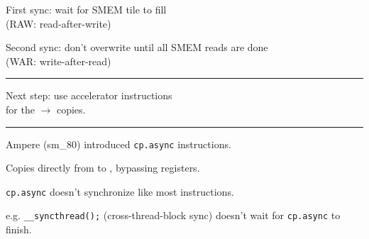 \newpage
{}

{\LARGE
First sync: wait for SMEM tile to fill\\(RAW: read-after-write)

Second sync: don't overwrite until all SMEM reads are done\\(WAR: write-after-read)

}

\vfill
\hrule
\vfill

\begin{center}
\Large
\begin{tikzpicture}[node distance=0mm]

\end{tikzpicture}
\end{center}

\newpage
{}

{\LARGE
Next step: use accelerator instructions\\for the $\to$ copies.

}

\vfill
\hrule
\vfill

\begin{center}
\Large
{}
\end{center}


\newpage
{}

{\LARGE
Ampere (sm\_80) introduced \texttt{cp.async} instructions.

Copies directly from  to , bypassing registers.

}
\vfill

\begin{center}
\Large
\begin{tikzpicture}[node distance=0mm]

\end{tikzpicture}
\end{center}


\newpage
{}

{\LARGE
\texttt{cp.async} doesn't synchronize like most instructions.

e.g. \texttt{\_\_syncthread();} (cross-thread-block sync) doesn't wait for \texttt{cp.async} to finish.

}
\vfill

